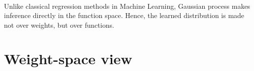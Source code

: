 \documentclass[a4paper]{article}
\begin{document}
	
	\paragraph{} Unlike classical regression methods in Machine Learning, Gaussian process makes inference directly in the function space. Hence, the learned distribution is made not over weights, but over functions. 
	
	\vhrulefill{2pt}
	
	\tableofcontents
	
	\vhrulefill{2pt}
	
	
	\section{Weight-space view}
\end{document}
